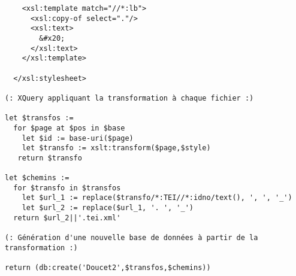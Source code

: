 \begin{verbatim}
    <xsl:template match="//*:lb">
      <xsl:copy-of select="."/>
      <xsl:text>
        &#x20;
      </xsl:text>
    </xsl:template>
      
  </xsl:stylesheet>
 
(: XQuery appliquant la transformation à chaque fichier :)

let $transfos := 
  for $page at $pos in $base
    let $id := base-uri($page)
    let $transfo := xslt:transform($page,$style)
   return $transfo

let $chemins := 
  for $transfo in $transfos
    let $url_1 := replace($transfo/*:TEI//*:idno/text(), ', ', '_')
    let $url_2 := replace($url_1, '. ', '_')
  return $url_2||'.tei.xml'
    
(: Génération d'une nouvelle base de données à partir de la transformation :)

return (db:create('Doucet2',$transfos,$chemins))
\end{verbatim}